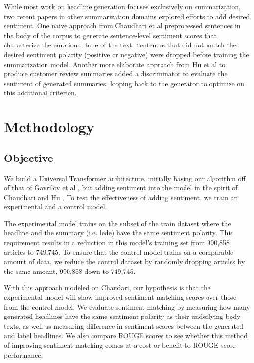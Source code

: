 \documentclass[11pt]{article}
\begin{document}
While most work on headline generation focuses exclusively on summarization, two recent papers in other summarization domains explored efforts to add desired sentiment. One naive approach from Chaudhari et al \cite{DBLP:journals/corr/abs-1802-09426} preprocessed sentences in the body of the corpus to generate sentence-level sentiment scores that characterize the emotional tone of the text. Sentences that did not match the desired sentiment polarity (positive or negative) were dropped before training the summarization model. Another more elaborate approach from Hu et al \cite{DBLP:journals/corr/HuYLSX17} to produce customer review summaries added a discriminator to evaluate the sentiment of generated summaries, looping back to the generator to optimize on this additional criterion. 

\section{Methodology}

\subsection{Objective}
We build a Universal Transformer architecture, initially basing our algorithm off of that of Gavrilov et al \cite{DBLP:journals/corr/abs-1901-07786}, but adding sentiment into the model in the spirit of Chaudhari \cite{DBLP:journals/corr/abs-1802-09426} and Hu \cite{DBLP:journals/corr/HuYLSX17}. To test the effectiveness of adding sentiment, we train an experimental and a control model.

The experimental model trains on the subset of the train dataset where the headline and the summary (i.e. lede) have the same sentiment polarity. This requirement results in a reduction in this model's training set from 990,858 articles to 749,745. To ensure that the control model trains on a comparable amount of data, we reduce the control dataset by randomly dropping articles by the same amount, 990,858 down to 749,745. 

With this approach modeled on Chaudari\cite{DBLP:journals/corr/abs-1802-09426}, our hypothesis is that the experimental model will show improved sentiment matching scores over those from the control model. We evaluate sentiment matching by measuring how many generated headlines have the same sentiment polarity as their underlying body texts, as well as measuring difference in sentiment scores between the generated and label headlines. We also compare ROUGE scores to see whether this method of improving sentiment matching comes at a cost or benefit to ROUGE score performance. 
\end{document}
